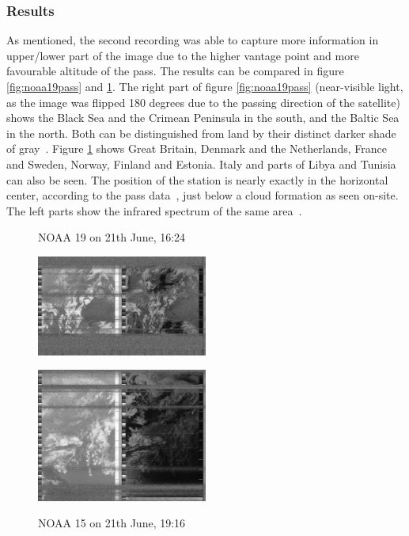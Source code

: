 \documentclass[conference]{IEEEtran}
\begin{document}
\subsubsection{Results}
As mentioned, the second recording was able to capture more information in upper/lower part of the image due to the higher vantage point and more favourable altitude of the pass. The results can be compared in figure \ref{fig:noaa19pass} and \ref{fig:noaa15pass}. The right part of figure \ref{fig:noaa19pass} (near-visible light, as the image was flipped 180 degrees due to the passing direction of the satellite) shows the Black Sea and the Crimean Peninsula in the south, and the Baltic Sea in the north. Both can be distinguished from land by their distinct darker shade of gray~\cite[42p]{NOAA19building}. Figure \ref{fig:noaa15pass} shows Great Britain, Denmark and the Netherlands, France and Sweden, Norway, Finland and Estonia. Italy and parts of Libya and Tunisia can also be seen. The position of the station is nearly exactly in the horizontal center, according to the pass data~\cite{heavensabove19noaa15}, just below a cloud formation as seen on-site.\\
The left parts show the infrared spectrum of the same area~\cite{NOAA19building}.
\begin{figure}
	\centering
	\caption{NOAA 19 on 21th June, 16:24}
	\includegraphics[width=0.5\textwidth]{noaa19_21-06-2019_1624} \label{fig:noaa19pass}
	\caption{NOAA 15 on 21th June, 19:16}
	\includegraphics[width=0.5\textwidth]{noaa15_21-06-2019-1916} \label{fig:noaa15pass}
\end{figure}
\end{document}
